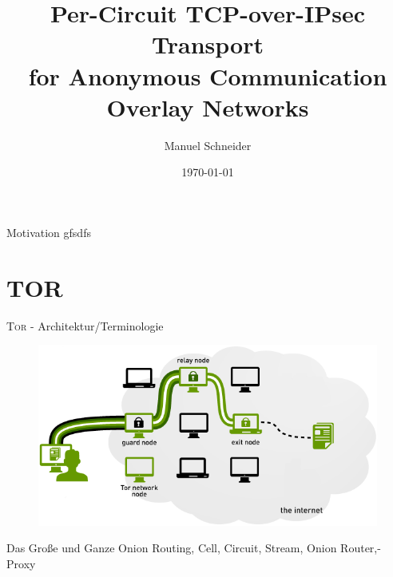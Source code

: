 \documentclass{beamer}
\title{Per-Circuit TCP-over-IPsec Transport\\for Anonymous Communication Overlay Networks}
\author{Manuel Schneider}
\institute{Albert Ludwigs Universität - Institut für Informatik}
\date{\today}
\begin{document}

\begin{frame}
  \titlepage
\end{frame}


\begin{frame}{Motivation}
gfsdfs
\end{frame}

\section{TOR}



\begin{frame}{\textsc{Tor} - Architektur/Terminologie}
  \begin{figure}
    \includegraphics[width=\textwidth]{pics/tor}
  \end{figure}
Das Große und Ganze
Onion Routing, Cell, Circuit, Stream, Onion Router,- Proxy
\end{frame}
\end{document}
